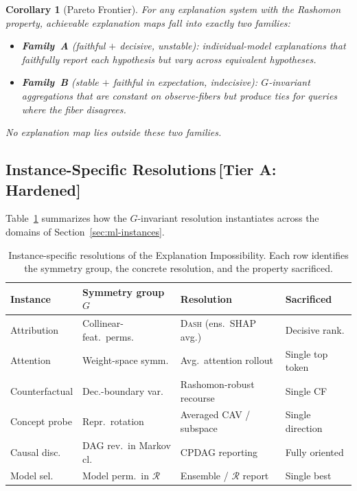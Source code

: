 \documentclass[11pt,a4paper]{article}
\newtheorem{corollary}[theorem]{Corollary}
\newcommand{\DASH}{\textsc{Dash}}
\begin{document}
\begin{corollary}[Pareto Frontier]
\label{cor:pareto}
For any explanation system with the Rashomon property, achievable
explanation maps fall into exactly two families:
\begin{itemize}
  \item \textbf{Family~A} (faithful $+$ decisive, unstable): individual-model
    explanations that faithfully report each hypothesis but vary across
    equivalent hypotheses.
  \item \textbf{Family~B} (stable $+$ faithful in expectation, indecisive):
    $G$-invariant aggregations that are constant on observe-fibers but
    produce ties for queries where the fiber disagrees.
\end{itemize}
No explanation map lies outside these two families.
\end{corollary}

\subsection{Instance-Specific Resolutions\,\textnormal{\normalsize[Tier A: Hardened]}}
\label{sec:resolution-instances}

Table~\ref{tab:resolutions} summarizes how the $G$-invariant resolution
instantiates across the domains of Section~\ref{sec:ml-instances}.

\begin{table}[t]
\centering
\caption{Instance-specific resolutions of the Explanation
  Impossibility.  Each row identifies the symmetry group, the concrete
  resolution, and the property sacrificed.}
\label{tab:resolutions}
\small
\setlength{\tabcolsep}{4pt}
\begin{tabular}{@{}llll@{}}
\toprule
Instance & Symmetry group $G$ & Resolution & Sacrificed \\
\midrule
Attribution & Collinear-feat.\ perms. & \DASH{} (ens.\ SHAP avg.) & Decisive rank. \\
Attention & Weight-space symm. & Avg.\ attention rollout & Single top token \\
Counterfactual & Dec.-boundary var. & Rashomon-robust recourse & Single CF \\
Concept probe & Repr.\ rotation & Averaged CAV / subspace & Single direction \\
Causal disc. & DAG rev.\ in Markov cl. & CPDAG reporting & Fully oriented \\
Model sel. & Model perm.\ in $\mathcal{R}$ & Ensemble / $\mathcal{R}$ report & Single best \\
\bottomrule
\end{tabular}
\end{table}
\end{document}
